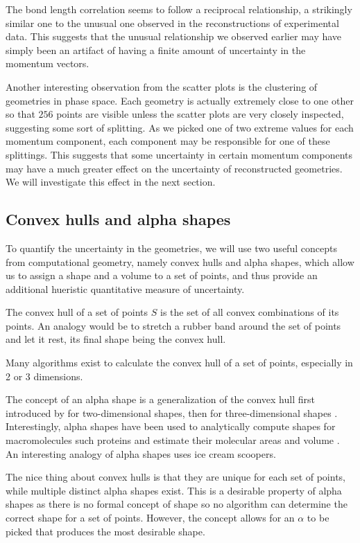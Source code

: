 The bond length correlation seems to follow a reciprocal relationship, a strikingly similar one to the unusual one observed in the reconstructions of experimental data. This suggests that the unusual relationship we observed earlier may have simply been an artifact of having a finite amount of uncertainty in the momentum vectors.

Another interesting observation from the scatter plots is the clustering of geometries in phase space. Each geometry is actually extremely close to one other so that $256$ points are visible unless the scatter plots are very closely inspected, suggesting some sort of splitting. As we picked one of two extreme values for each momentum component, each component may be responsible for one of these splittings. This suggests that some uncertainty in certain momentum components may have a much greater effect on the uncertainty of reconstructed geometries. We will investigate this effect in the next section.

\subsection{Convex hulls and alpha shapes}
To quantify the uncertainty in the geometries, we will use two useful concepts from computational geometry, namely convex hulls and alpha shapes, which allow us to assign a shape and a volume to a set of points, and thus provide an additional hueristic quantitative measure of uncertainty.

The convex hull of a set of points $S$ is the set of all convex combinations of its points. An analogy would be to stretch a rubber band around the set of points and let it rest, its final shape being the convex hull.

Many algorithms exist to calculate the convex hull of a set of points, especially in 2 or 3 dimensions.

The concept of an alpha shape is a generalization of the convex hull first introduced by \citet{Edelsbrunner83} for two-dimensional shapes, then for three-dimensional shapes \citep{Edelsbrunner94}. Interestingly, alpha shapes have been used to analytically compute shapes for macromolecules such proteins and estimate their molecular areas and volume \citep{Liang98}. An interesting analogy of alpha shapes uses ice cream scoopers.

The nice thing about convex hulls is that they are unique for each set of points, while multiple distinct alpha shapes exist. This is a desirable property of alpha shapes as there is no formal concept of shape so no algorithm can determine the correct shape for a set of points. However, the concept allows for an $\alpha$ to be picked that produces the most desirable shape. 

